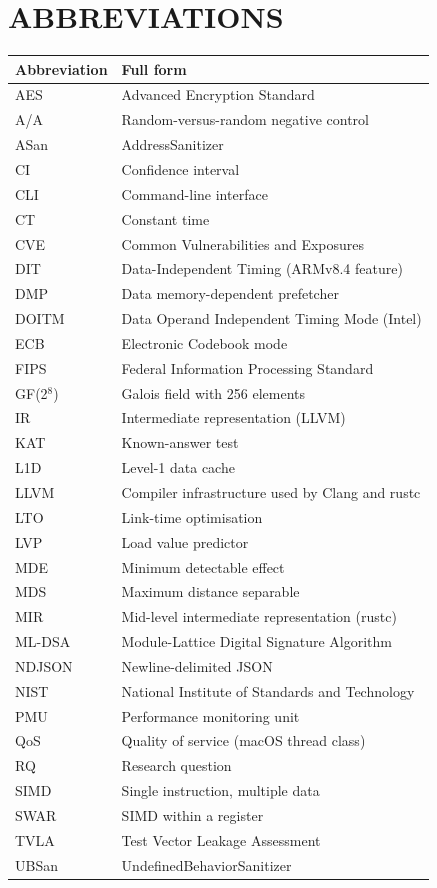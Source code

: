 \chapter*{\normalsize ABBREVIATIONS}

\begin{center}
\renewcommand{\arraystretch}{1.08}
\begin{longtable}{@{}p{}p{}@{}}
\textbf{Abbreviation} & \textbf{Full form} \\
\midrule
\endhead
AES & Advanced Encryption Standard \\
A/A & Random-versus-random negative control \\
ASan & AddressSanitizer \\
CI & Confidence interval \\
CLI & Command-line interface \\
CT & Constant time \\
CVE & Common Vulnerabilities and Exposures \\
DIT & Data-Independent Timing (ARMv8.4 feature) \\
DMP & Data memory-dependent prefetcher \\
DOITM & Data Operand Independent Timing Mode (Intel) \\
ECB & Electronic Codebook mode \\
FIPS & Federal Information Processing Standard \\
GF(2$^8$) & Galois field with 256 elements \\
IR & Intermediate representation (LLVM) \\
KAT & Known-answer test \\
L1D & Level-1 data cache \\
LLVM & Compiler infrastructure used by Clang and rustc \\
LTO & Link-time optimisation \\
LVP & Load value predictor \\
MDE & Minimum detectable effect \\
MDS & Maximum distance separable \\
MIR & Mid-level intermediate representation (rustc) \\
ML-DSA & Module-Lattice Digital Signature Algorithm \\
NDJSON & Newline-delimited JSON \\
NIST & National Institute of Standards and Technology \\
PMU & Performance monitoring unit \\
QoS & Quality of service (macOS thread class) \\
RQ & Research question \\
SIMD & Single instruction, multiple data \\
SWAR & SIMD within a register \\
TVLA & Test Vector Leakage Assessment \\
UBSan & UndefinedBehaviorSanitizer \\
\end{longtable}
\end{center}
\clearpage
